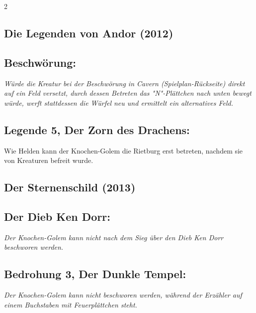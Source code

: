 \documentclass[10pt, a4paper, oneside]{book}
\newcommand{\fan}[1]{\textit{#1}}
\begin{document}
\begin{multicols*}{2}
\begin{bgcolor}
\section{Die Legenden von Andor (2012)}




\subsection{Beschwörung:}

\fan{Würde die Kreatur bei der Beschwörung in Cavern (Spielplan-Rückseite) direkt auf ein Feld versetzt, durch dessen Betreten das "N"-Plättchen nach unten bewegt würde, werft stattdessen die Würfel neu und ermittelt ein alternatives Feld.}


\subsection{Legende 5, Der Zorn des Drachens:}

Wie Helden kann der Knochen-Golem die Rietburg erst betreten, nachdem sie von Kreaturen befreit wurde.
\supercite{DH:FAQ}


\end{bgcolor}


\begin{bgcolor}
\section{Der Sternenschild (2013)}

\subsection{Der Dieb Ken Dorr:}

\fan{Der Knochen-Golem kann nicht nach dem Sieg über den Dieb Ken Dorr beschworen werden.}


\subsection{Bedrohung 3, Der Dunkle Tempel:}

\fan{Der Knochen-Golem kann nicht beschworen werden, während der Erzähler auf einem Buchstaben mit Feuerplättchen steht.}

\end{bgcolor}



\columnbreak





\end{multicols*}
\end{document}

